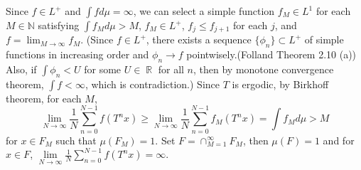 \documentclass[12pt]{article}
\newenvironment{problem}[2][Problem]{\begin{trivlist}
\item[\hskip \labelsep {\bfseries #1}\hskip \labelsep {\bfseries #2.}]}{\end{trivlist}}
\DeclareMathOperator{\rr}{\mathbb{R}}
\begin{document}
\begin{problem}{5}
\end{problem}
Since $f\in L^+$ and $\int f d\mu=\infty$, we can select a simple function $f_M\in L^1$ for each $M\in \mathbb{N}$ satisfying $\int f_M d\mu>M$, $f_M\in L^+$, $f_j\leq f_{j+1}$ for each $j$, and $f=\lim_{M\rightarrow \infty} f_M$. (Since $f\in L^+$, there exists a sequence $\{\phi_n\}\subset L^+$ of simple functions in increasing order and $\phi_n\rightarrow f$ pointwisely.(Folland Theorem 2.10 (a)) Also, if $\int \phi_n<U$ for some $U\in \rr$ for all $n$, then by monotone convergence theorem, $\int f<\infty$, which is contradiction.) Since $T$ is ergodic, by Birkhoff theorem, for each $M$,
\begin{equation*}
    \lim\limits_{N\rightarrow \infty}\frac{1}{N}\sum\limits_{n=0}^{N-1} f(T^n x)\geq \lim\limits_{N\rightarrow \infty}\frac{1}{N}\sum\limits_{n=0}^{N-1} f_M(T^n x)=\int f_M d\mu >M
\end{equation*}
for $x\in F_M$ such that $\mu(F_M)=1$. Set $F=\cap_{M=1}^\infty F_M$, then $\mu(F)=1$ and for $x\in F$, $\lim\limits_{N\rightarrow \infty}\frac{1}{N}\sum\limits_{n=0}^{N-1} f(T^n x)=\infty$.
\end{document}
